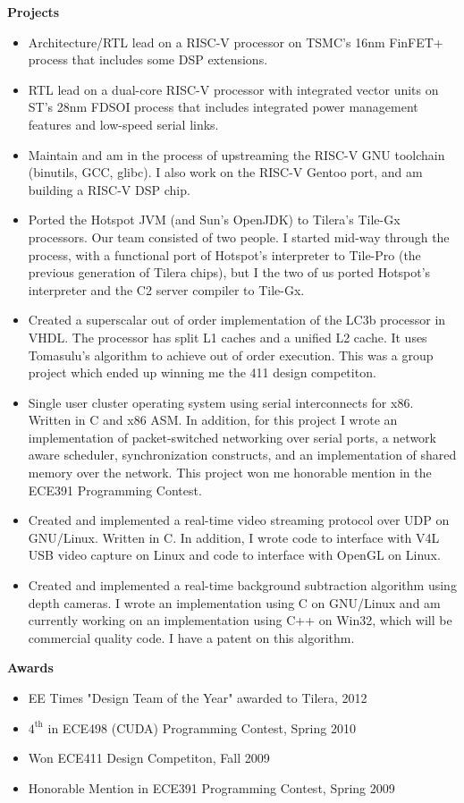 \documentclass{letter}
\begin{document}
\textbf{Projects}
\begin{itemize}
\item Architecture/RTL lead on a RISC-V processor on TSMC's 16nm FinFET+
  process that includes some DSP extensions.
\item RTL lead on a dual-core RISC-V processor with integrated vector units on
  ST's 28nm FDSOI process that includes integrated power management features
  and low-speed serial links.
\item Maintain and am in the process of upstreaming the RISC-V GNU toolchain
  (binutils, GCC, glibc).  I also work on the RISC-V Gentoo port, and am
  building a RISC-V DSP chip.
\item Ported the Hotspot JVM (and Sun's OpenJDK) to Tilera's Tile-Gx
  processors.  Our team consisted of two people.  I started mid-way
  through the process, with a functional port of Hotspot's interpreter
  to Tile-Pro (the previous generation of Tilera chips), but I the two
  of us ported Hotspot's interpreter and the C2 server compiler to
  Tile-Gx.
\item Created a superscalar out of order implementation of the LC3b
  processor in VHDL.  The processor has split L1 caches and a unified
  L2 cache.  It uses Tomasulu's algorithm to achieve out of order
  execution.  This was a group project which ended up winning me the
  411 design competiton.
\item Single user cluster operating system using serial interconnects
  for x86.  Written in C and x86 ASM.  In addition, for this project I
  wrote an implementation of packet-switched networking over serial
  ports, a network aware scheduler, synchronization constructs, and an
  implementation of shared memory over the network.  This project won
  me honorable mention in the ECE391 Programming Contest.
\item Created and implemented a real-time video streaming protocol
  over UDP on GNU/Linux.  Written in C.  In addition, I wrote code to
  interface with V4L USB video capture on Linux and code to interface
  with OpenGL on Linux.
\item Created and implemented a real-time background subtraction
  algorithm using depth cameras.  I wrote an implementation using C on
  GNU/Linux and am currently working on an implementation using C++ on
  Win32, which will be commercial quality code.  I have a patent on
  this algorithm.
\end{itemize}

\textbf{Awards}
\begin{itemize}
\item EE Times "Design Team of the Year" awarded to Tilera, 2012
\item $4^{\mathrm{th}}$ in ECE498 (CUDA) Programming Contest, Spring 2010
\item Won ECE411 Design Competiton, Fall 2009
\item Honorable Mention in ECE391 Programming Contest, Spring 2009
\end{itemize}
\vspace{0.2in}
\end{document}
